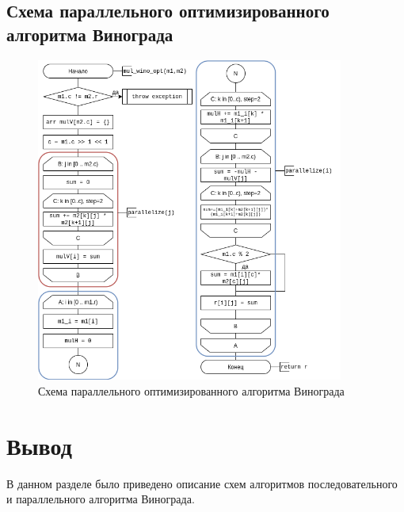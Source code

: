\subsection{Схема параллельного оптимизированного алгоритма Винограда}

\begin{figure}[h!]
    \centering
    \includegraphics[width=0.9\textwidth]{4/inc/d2.png}
    \caption{Схема параллельного оптимизированного алгоритма Винограда}
    \label{fig:2.3}
\end{figure}



\section{Вывод}
В данном разделе было приведено описание схем алгоритмов
последовательного и параллельного алгоритма Винограда.
